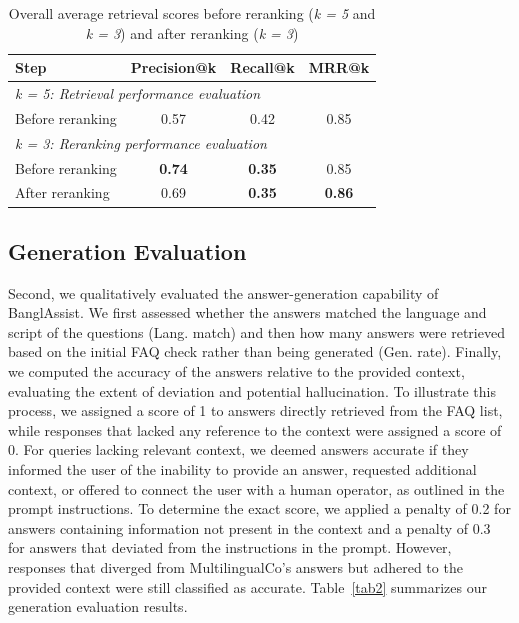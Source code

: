 \documentclass[sigconf]{acmart}
\begin{document}
\begin{table}
    \caption{Overall average retrieval scores before reranking (\textit{k = 5} and \textit{k = 3}) and after reranking (\textit{k = 3})}
    \label{tab1}
    \begin{tabular}{lccc}
        \toprule
        \textbf{Step} & \textbf{Precision@k} & \textbf{Recall@k} & \textbf{MRR@k}\\
        \toprule
        \multicolumn{4}{l}{\textit{k = 5: Retrieval performance evaluation}}\\
        \midrule
        Before reranking & 0.57 & 0.42 & 0.85\\
        \midrule
        \multicolumn{4}{l}{\textit{k = 3: Reranking performance evaluation}}\\
        \midrule
        Before reranking & \textbf{0.74} & \textbf{0.35} & 0.85\\
        After reranking & 0.69 & \textbf{0.35} & \textbf{0.86}\\
        \bottomrule
    \end{tabular}
\end{table}

\subsection{Generation Evaluation}

Second, we qualitatively evaluated the answer-generation capability of BanglAssist. We first assessed whether the answers matched the language and script of the questions (Lang. match) and then how many answers were retrieved based on the initial FAQ check rather than being generated (Gen. rate). Finally, we computed the accuracy of the answers relative to the provided context, evaluating the extent of deviation and potential hallucination. To illustrate this process, we assigned a score of 1 to answers directly retrieved from the FAQ list, while responses that lacked any reference to the context were assigned a score of 0. For queries lacking relevant context, we deemed answers accurate if they informed the user of the inability to provide an answer, requested additional context, or offered to connect the user with a human operator, as outlined in the prompt instructions. To determine the exact score, we applied a penalty of 0.2 for answers containing information not present in the context and a penalty of 0.3 for answers that deviated from the instructions in the prompt. However, responses that diverged from MultilingualCo's answers but adhered to the provided context were still classified as accurate. Table~\ref{tab2} summarizes our generation evaluation results.
\end{document}
